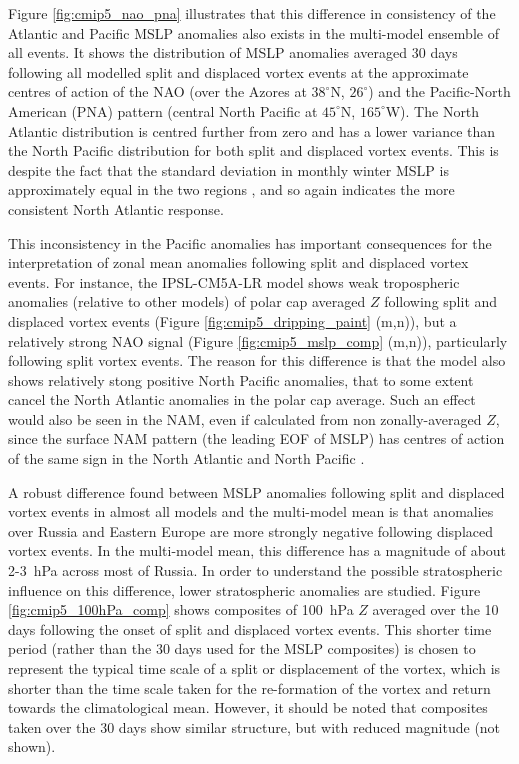 Figure \ref{fig:cmip5_nao_pna} illustrates that this difference in consistency
of the Atlantic and Pacific MSLP anomalies also exists in the multi-model
ensemble of all events. It shows the distribution of MSLP anomalies averaged 30
days following all modelled split and displaced vortex events at the approximate
centres of action of the NAO (over the Azores at $38^{\circ}$N, $26^{\circ}$)
and the Pacific-North American (PNA) pattern (central North Pacific at
$45^{\circ}$N, $165^{\circ}$W). The North Atlantic distribution is centred
further from zero and has a lower variance than the North Pacific distribution
for both split and displaced vortex events. This is despite the fact that the
standard deviation in monthly winter MSLP is approximately equal in the two
regions \citep{Allan2006}, and so again indicates the more consistent North
Atlantic response.

This inconsistency in the Pacific anomalies has important consequences for the
interpretation of zonal mean anomalies following split and displaced vortex
events. For instance, the IPSL-CM5A-LR model shows weak tropospheric anomalies
(relative to other models) of polar cap averaged $Z$ following split and
displaced vortex events (Figure \ref{fig:cmip5_dripping_paint} (m,n)), but a
relatively strong NAO signal (Figure \ref{fig:cmip5_mslp_comp} (m,n)),
particularly following split vortex events. The reason for this difference is
that the model also shows relatively stong positive North Pacific anomalies,
that to some extent cancel the North Atlantic anomalies in the polar cap
average. Such an effect would also be seen in the NAM, even if calculated from
non zonally-averaged $Z$, since the surface NAM pattern (the leading EOF of
MSLP) has centres of action of the same sign in the North Atlantic and North
Pacific \citep[e.g.,][]{Ambaum2001}.

A robust difference found between MSLP anomalies following split and displaced
vortex events in almost all models and the multi-model mean is that anomalies
over Russia and Eastern Europe are more strongly negative following displaced
vortex events. In the multi-model mean, this difference has a magnitude of about
2-3~hPa across most of Russia. In order to understand the possible stratospheric
influence on this difference, lower stratospheric anomalies are studied. Figure
\ref{fig:cmip5_100hPa_comp} shows composites of 100~hPa $Z$ averaged over the 10
days following the onset of split and displaced vortex events. This shorter time
period (rather than the 30 days used for the MSLP composites) is chosen to
represent the typical time scale of a split or displacement of the vortex, which
is shorter than the time scale taken for the re-formation of the vortex and
return towards the climatological mean. However, it should be noted that
composites taken over the 30 days show similar structure, but with reduced
magnitude (not shown). 

